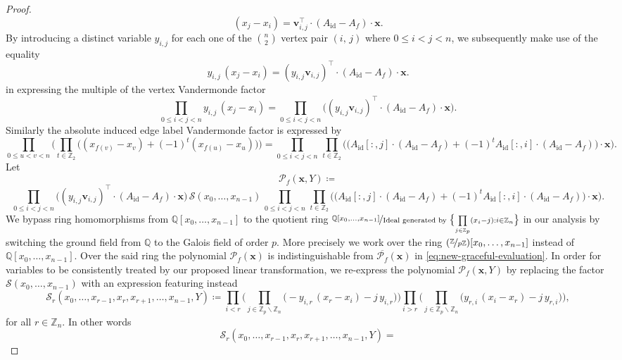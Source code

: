 \begin{proof}
\[
(x_{j}-x_{i})=\mathbf{v}_{i,j}^{\top}\cdot (A_{\text{id}}-A_{f})\cdot\mathbf{x}.
\]
By introducing a distinct variable $y_{i,j}$ for each one of the ${n \choose 2}$ vertex pair $(i,\,j)$ where $0\le i < j <n$, we subsequently make use of the equality
\[
y_{i,j}\,(x_{j}-x_{i})=(y_{i,j}\mathbf{v}_{i,j})^{\top}\cdot(A_{\text{id}}-A_{f})\cdot\mathbf{x}.
\]
in expressing the multiple of the vertex Vandermonde factor
\[
\prod_{0\le i<j<n}y_{i,j}\,(x_{j}-x_{i})=\prod_{0\le i<j<n}\big((y_{i,j}\mathbf{v}_{i,j})^{\top}\cdot(A_{\text{id}}-A_{f})\cdot\mathbf{x}\big).
\]
Similarly the absolute induced edge label Vandermonde factor is expressed by
\[
\prod_{0\le u<v<n}\bigg(\prod_{t\in\mathbb{Z}_{2}}\big((x_{f(v)}-x_{v})+(-1)^{t}(x_{f(u)}-x_{u})\big)\bigg)=\prod_{0\le i<j<n}\,\prod_{t\in\mathbb{Z}_{2}}\bigg(\big(A_{\text{id}}[:,j]\cdot(A_{\text{id}}-A_{f})+(-1)^{t}A_{\text{id}}[:,i]\cdot(A_{\text{id}}-A_{f})\big)\cdot\mathbf{x}\bigg).
\]
Let
\[
\mathcal{P}_{f}(\mathbf{x},Y)\coloneq
\]
\[
\prod_{0\le i<j<n}\big((y_{i,j}\mathbf{v}_{i,j})^{\top}\cdot(A_{\text{id}}-A_{f})\cdot\mathbf{x}\big)\,\mathcal{S}(x_{0},\ldots,x_{n-1})\,\prod_{0\le i<j<n}\,\prod_{t\in\mathbb{Z}_{2}}\bigg(\big(A_{\text{id}}[:,j]\cdot(A_{\text{id}}-A_{f})+(-1)^{t}A_{\text{id}}[:,i]\cdot(A_{\text{id}}-A_{f})\big)\cdot\mathbf{x}\bigg).
\]
We bypass ring homomorphisms from $\mathbb{Q}[x_0,\ldots , x_{n-1}]$ to the quotient ring $\nicefrac{\mathbb{Q}[x_{0},\ldots,x_{n-1}]}{\text{Ideal generated by }\big\{\underset{j\in\mathbb{Z}_{p}}{\prod}(x_{i}-j):i\in\mathbb{Z}_{n}\big\}}$ in our analysis by switching the ground field from $\mathbb{Q}$ to the Galois field of order $p$. More precisely we work over the ring $(\nicefrac{\mathbb{Z}}{p\mathbb{Z}})[x_{0},\ldots,x_{n-1}]$ instead of $\mathbb{Q}[x_{0},\ldots,x_{n-1}]$. Over the said ring the polynomial $\mathcal{P}_f(\mathbf{x})$ is indistinguishable from $\overline{\mathcal{P}_{f}}(\mathbf{x})$ in \ref{eq:new-graceful-evaluation}. 
In order for variables to be consistently treated by our proposed linear transformation, we re-express the polynomial $\mathcal{P}_{f}(\mathbf{x},Y)$ by replacing the factor $\mathcal{S}(x_{0},\ldots,x_{n-1})$
with an expression featuring instead
\[
\mathcal{S}_{r}(x_{0},\ldots,x_{r-1},x_{r},x_{r+1},\ldots,x_{n-1},Y)\coloneq\prod_{i<r}\bigg(\prod_{j\in\mathbb{Z}_{p}\backslash\mathbb{Z}_{n}}\big(-y_{i,r}\,(x_{r}-x_{i})-j\,y_{i,r}\big)\bigg)\prod_{i>r}\bigg(\prod_{j\in\mathbb{Z}_{p}\backslash\mathbb{Z}_{n}}\big(y_{r,i}\,(x_{i}-x_{r})-j\,y_{r,i}\big)\bigg),
\]
for all $r\in \mathbb{Z}_n$. In other words
\[
\mathcal{S}_{r}(x_{0},\ldots,x_{r-1},x_{r},x_{r+1},\ldots,x_{n-1},Y)=
\]
\end{proof}
